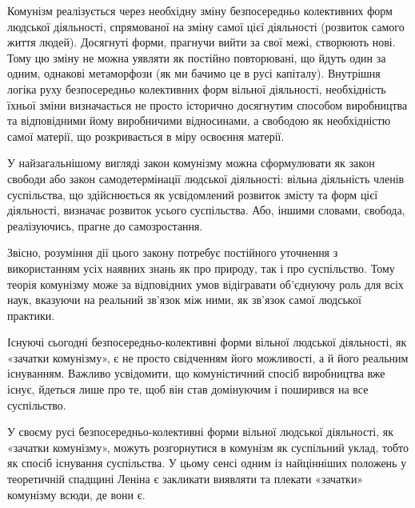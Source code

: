 \documentclass[../main]{subfiles}
\begin{document}
Комунізм реалізується через необхідну зміну безпосередньо колективних форм людської діяльності, спрямованої на зміну самої цієї діяльності (розвиток самого життя людей). Досягнуті форми, прагнучи вийти за свої межі, створюють нові. Тому цю зміну не можна уявляти як постійно повторювані, що йдуть один за одним, однакові метаморфози (як ми бачимо це в русі капіталу). Внутрішня логіка руху безпосередньо колективних форм вільної діяльності, необхідність їхньої зміни визначається не просто історично досягнутим способом виробництва та відповідними йому виробничими відносинами, а свободою як необхідністю самої матерії, що розкривається в міру освоєння матерії.

У найзагальнішому вигляді закон комунізму можна сформулювати як закон свободи або закон самодетермінації людської діяльності: вільна діяльність членів суспільства, що здійснюється як усвідомлений розвиток змісту та форм цієї діяльності, визначає розвиток усього суспільства. Або, іншими словами, свобода, реалізуючись, прагне до самозростання.

Звісно, розуміння дії цього закону потребує постійного уточнення з використанням усіх наявних знань як про природу, так і про суспільство. Тому теорія комунізму може за відповідних умов відігравати об’єднуючу роль для всіх наук, вказуючи на реальний зв’язок між ними, як зв’язок самої людської практики.

Існуючі сьогодні безпосередньо-колективні форми вільної людської діяльності, як «зачатки комунізму», є не просто свідченням його можливості, а й його реальним існуванням. Важливо усвідомити, що комуністичний спосіб виробництва вже існує, йдеться лише про те, щоб він став домінуючим і поширився на все суспільство.

У своєму русі безпосередньо-колективні форми вільної людської діяльності, як «зачатки комунізму», можуть розгорнутися в комунізм як суспільний уклад, тобто як спосіб існування суспільства. У цьому сенсі одним із найцінніших положень у теоретичній спадщині Леніна є закликати виявляти та плекати «зачатки» комунізму всюди, де вони є.
\end{document}
